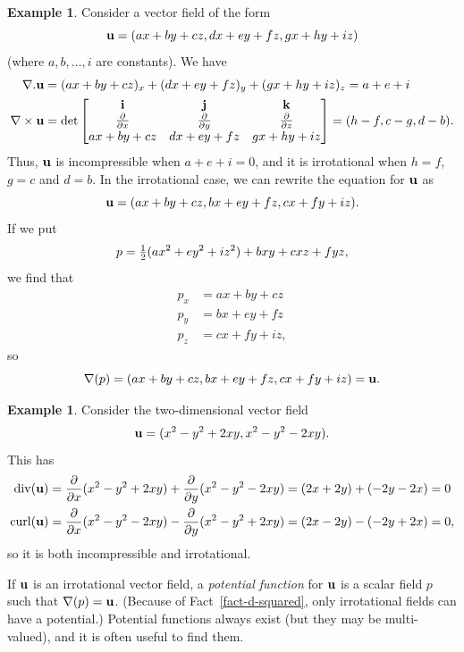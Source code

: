 \documentclass[reqno]{amsart}
\theoremstyle{definition}
\newtheorem{example}[theorem]{Example}
\begin{document}
\begin{example}\label{eg-linear-vector-field}
 Consider a vector field of the form
 \[ \mathbf{u} = (ax+by+cz,dx+ey+fz,gx+hy+iz) \]
 (where $a,b,\dotsc,i$ are constants).  We have
 \begin{align*}
  \nabla.\mathbf{u} &= 
   (ax+by+cz)_x + (dx+ey+fz)_y + (gx+hy+iz)_z = a+e+i \\
  \nabla\times\mathbf{u} &= 
  \det\left[\begin{matrix} \mathbf{i} & \mathbf{j} & \mathbf{k} \\
           \frac{\partial}{\partial x} &
           \frac{\partial}{\partial y} &
           \frac{\partial}{\partial z} \\
           ax+by+cz & dx+ey+fz & gx+hy+iz \end{matrix}\right] = 
   (h-f,c-g,d-b).
 \end{align*}
 Thus, $\mathbf{u}$ is incompressible when $a+e+i=0$, and it is irrotational
 when $h=f$, $g=c$ and $d=b$.  In the irrotational case, we can
 rewrite the equation for $\mathbf{u}$ as
 \[ \mathbf{u} = (ax+by+cz,bx+ey+fz,cx+fy+iz). \]
 If we put 
 \[ p = \tfrac{1}{2}(ax^2+ey^2+iz^2) + bxy + cxz + fyz, \]
 we find that
 \begin{align*}
  p_x &= ax+by+cz \\
  p_y &= bx+ey+fz \\
  p_z &= cx+fy+iz,
 \end{align*}
 so
 \[ \nabla(p) = (ax+by+cz,bx+ey+fz,cx+fy+iz) = \mathbf{u}. \]
\end{example}
\begin{example}\label{eg-irrotational-two}
 Consider the two-dimensional vector field
 \[ \mathbf{u} = (x^2-y^2+2xy,x^2-y^2-2xy). \]
 This has
 \begin{align*}
  \operatorname{div}(\mathbf{u})   &= \frac{\partial}{\partial x}(x^2-y^2+2xy) + 
                \frac{\partial}{\partial y}(x^2-y^2-2xy) 
              = (2x+2y)+(-2y-2x) = 0 \\
  \operatorname{curl}(\mathbf{u}) &= \frac{\partial}{\partial x}(x^2-y^2-2xy) - 
                \frac{\partial}{\partial y}(x^2-y^2+2xy) 
              = (2x-2y)-(-2y+2x) = 0,
 \end{align*}
 so it is both incompressible and irrotational.
\end{example}

If $\mathbf{u}$ is an irrotational vector field, a \emph{potential function}
for $\mathbf{u}$ is a scalar field $p$ such that $\nabla(p)=\mathbf{u}$.  (Because
of Fact~\ref{fact-d-squared}, only irrotational fields can have a
potential.)  Potential functions always exist (but they may be
multi-valued), and it is often useful to find them.
\end{document}
